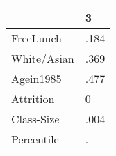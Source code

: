 \begin{table}[htbp]
\begin{tabular}{ll} \hline \hline
 & 3  \\  \hline 
FreeLunch & .184 \\  
White/Asian & .369 \\  
Agein1985 & .477 \\  
Attrition & 0 \\  
Class-Size & .004 \\  
Percentile & . \\  
\hline \hline \end{tabular}
\end{table}
